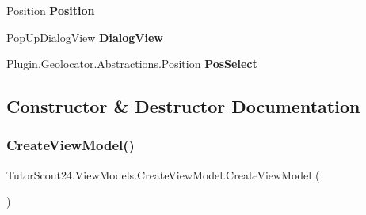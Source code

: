 \begin{DoxyCompactItemize}
\item 
\mbox{\label{class_tutor_scout24_1_1_view_models_1_1_create_view_model_abd9a6e449f6e012f8b7ba2e0cbd93369}} 
Position {\bfseries Position}
\item 
\mbox{\label{class_tutor_scout24_1_1_view_models_1_1_create_view_model_aad21601c5c722bf3def86047d35346df}} 
\mbox{\hyperlink{class_tutor_scout24_1_1_controls_1_1_pop_up_dialog_view}{Pop\+Up\+Dialog\+View}} {\bfseries Dialog\+View}
\item 
\mbox{\label{class_tutor_scout24_1_1_view_models_1_1_create_view_model_ae6b5ae83b31fb87d9b86cc6f16ee35f3}} 
Plugin.\+Geolocator.\+Abstractions.\+Position {\bfseries Pos\+Select}
\end{DoxyCompactItemize}


\subsection{Constructor \& Destructor Documentation}
\mbox{\label{class_tutor_scout24_1_1_view_models_1_1_create_view_model_aa617a300b1411a5a4f28b5b72bf177d6}} 
\subsubsection{\texorpdfstring{Create\+View\+Model()}{CreateViewModel()}}
{\footnotesize\ttfamily Tutor\+Scout24.\+View\+Models.\+Create\+View\+Model.\+Create\+View\+Model (\begin{DoxyParamCaption}{ }\end{DoxyParamCaption})\hspace{0.3cm}{\ttfamily [inline]}}



